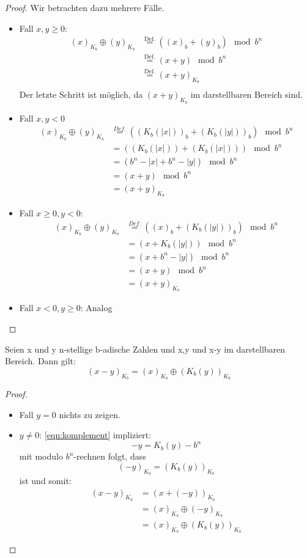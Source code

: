 \begin{proof}
Wir betrachten dazu mehrere Fälle.
\begin{itemize}
	\item Fall $x,y \ge 0$: \\
\begin{align*}
(x)_{K_b} \oplus (y)_{K_b}
    &\overset{\text{Def.}}{=}\left( (x)_b + (y)_b \right) \mod b^{n} \\
    &\overset{\text{Def.}}{=} (x+y) \mod b^{n} \\
    &\overset{\text{Def.}}{=} (x+y)_{K_b} \\
\end{align*}
Der letzte Schritt ist möglich, da $(x+y)_{K_b}$ im darstellbaren Bereich sind.
\item Fall $x,y <0$
\begin{align*}
(x)_{K_b} \oplus (y)_{K_b}
&\overset{Def.}{=} \left( \left( K_b(|x|) \right)_b + \left( K_b(|y|) \right)_b \right) \mod b^{n} \\
&\overset{   }{=}\left( (K_b(|x|)) +\left( K_b\left( |x| \right) \right)\right) \mod b^{n} \\
&= (b^{n}-|x| + b^{n}-|y|) \mod b^{n} \\
&= (x+y) \mod b^{n} \\
&= (x+y)_{K_b}
\end{align*}
\item Fall $x\ge 0, y<0$: \\
\begin{align*}
(x)_{K_b} \oplus (y)_{K_b}
&\overset{Def.}{=} ((x)_b + (K_b(|y|))_b) \mod b^{n} \\
&=(x+K_b(|y|)) \mod b^{n} \\
&=(x+b^{n}-|y|) \mod b^{n} \\
&=(x+y) \mod b^{n} \\
&= (x+y)_{K_b}
\end{align*}
\item Fall $x<0, y\ge 0$: Analog
\end{itemize}
\end{proof}
\begin{theorem}
	Seien x und y n-stellige b-adische Zahlen und x,y und x-y im darstellbaren Bereich.
	Dann gilt:
	\[
	(x-y)_{K_b} = (x)_{K_b} \oplus \left( K_b(y) \right)_{K_b}
	\]
\end{theorem}
\begin{proof}
\begin{itemize}
	\item Fall $y=0$ nichts zu zeigen.
	\item $y \neq 0$: \eqref{eqn:komplement} impliziert:
		\[
		-y=K_b(y) -b^{n}
		\]
	mit modulo $b^{n}$-rechnen folgt, dass
	\[
		(-y)_{K_b}= (K_b(y))_{K_b}
	\]
	ist und somit:
	\begin{align*}
		(x-y)_{K_b}
		&= (x+(-y))_{K_b} \\
		&= (x)_{K_b} \oplus (-y)_{K_b} \\
		&= (x)_{K_b} \oplus (K_b(y))_{K_b}	
	\end{align*}
\end{itemize}
\end{proof}
